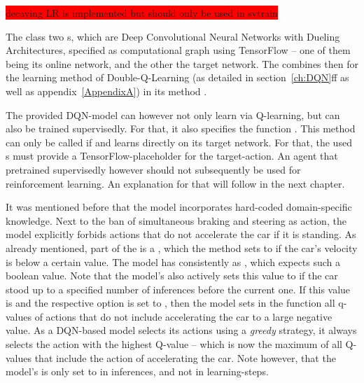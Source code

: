 \colorbox{red}{decaying LR is implemented but should only be used in svtrain}

The class   two s, which are Deep Convolutional Neural Networks with Dueling Architectures, specified as computational graph using TensorFlow -- one of them being its online network, and the other the target network. The  combines then for the learning method of Double-Q-Learning (as detailed in section~\ref{ch:DQN}ff as well as appendix~\ref{AppendixA}) in its method . 

The provided DQN-model can however not only learn via Q-learning, but can also be trained supervisedly. For that, it also specifies the function . This method can only be called if  and learns directly on its target network. For that, the used s must provide a TensorFlow-placeholder for the target-action. An agent that pretrained supervisedly however should not subsequently be used for reinforcement learning. An explanation for that will follow in the next chapter.

It was mentioned before that the model incorporates hard-coded domain-specific knowledge. Next to the ban of simultaneous braking and steering as action, the model explicitly forbids actions that do not accelerate the car if it is standing. As already mentioned, part of the  is a , which the method  sets to  if the car's velocity is below a certain value. The model has consistently as , which expects such a boolean value. Note that the model's  also actively sets this value to  if the car stood up to a specified number of inferences before the current one. If this value is  and the respective option  is set to , then the model sets in the function  all q-values of actions that do not include accelerating the car to a large negative value. As a DQN-based model selects its actions using a \textit{greedy} strategy, it always selects the action with the highest Q-value -- which is now the maximum of all Q-values that include the action of accelerating the car. Note however, that the model's  is only set to  in inferences, and not in learning-steps.

